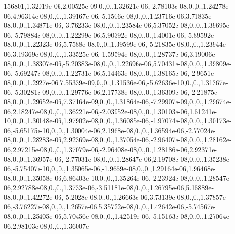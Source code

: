 {156801,1.\-32019e-\/06,2.\-00525e-\/09,0.,0.,1.\-32621e-\/06,-\/2.\-78103e-\/08,0.,0.,1.\-24278e-\/06,4.\-96314e-\/08,0.,0.,1.\-39167e-\/06,-\/5.\-1506e-\/08,0.,0.,1.\-23716e-\/06,3.\-71835e-\/08,0.,0.,1.\-34871e-\/06,-\/3.\-76233e-\/08,0.,0.,1.\-23584e-\/06,5.\-37052e-\/08,0.,0.,1.\-39695e-\/06,-\/5.\-79884e-\/08,0.,0.,1.\-22299e-\/06,5.\-90392e-\/08,0.,0.,1.\-4001e-\/06,-\/5.\-89592e-\/08,0.,0.,1.\-22323e-\/06,5.\-7588e-\/08,0.,0.,1.\-39599e-\/06,-\/5.\-21835e-\/08,0.,0.,1.\-23944e-\/06,3.\-19369e-\/08,0.,0.,1.\-33525e-\/06,-\/1.\-59594e-\/08,0.,0.,1.\-28737e-\/06,3.\-19006e-\/08,0.,0.,1.\-38307e-\/06,-\/5.\-20383e-\/08,0.,0.,1.\-22696e-\/06,5.\-70431e-\/08,0.,0.,1.\-39809e-\/06,-\/5.\-69247e-\/08,0.,0.,1.\-22731e-\/06,5.\-14463e-\/08,0.,0.,1.\-38165e-\/06,-\/2.\-9651e-\/08,0.,0.,1.\-2927e-\/06,7.\-55339e-\/09,0.,0.,1.\-31536e-\/06,-\/5.\-62636e-\/10,0.,0.,1.\-31367e-\/06,-\/5.\-30281e-\/09,0.,0.,1.\-29776e-\/06,2.\-17738e-\/08,0.,0.,1.\-36309e-\/06,-\/2.\-21875e-\/08,0.,0.,1.\-29652e-\/06,7.\-37164e-\/09,0.,0.,1.\-31864e-\/06,-\/7.\-29907e-\/09,0.,0.,1.\-29674e-\/06,2.\-18247e-\/08,0.,0.,1.\-36221e-\/06,-\/2.\-03952e-\/08,0.,0.,1.\-30103e-\/06,1.\-51241e-\/10,0.,0.,1.\-30148e-\/06,1.\-97902e-\/08,0.,0.,1.\-36085e-\/06,-\/1.\-97074e-\/08,0.,0.,1.\-30173e-\/06,-\/5.\-65175e-\/10,0.,0.,1.\-30004e-\/06,2.\-1968e-\/08,0.,0.,1.\-36594e-\/06,-\/2.\-77024e-\/08,0.,0.,1.\-28283e-\/06,2.\-92369e-\/08,0.,0.,1.\-37054e-\/06,-\/2.\-96407e-\/08,0.,0.,1.\-28162e-\/06,2.\-97215e-\/08,0.,0.,1.\-37079e-\/06,-\/2.\-96408e-\/08,0.,0.,1.\-28186e-\/06,2.\-92371e-\/08,0.,0.,1.\-36957e-\/06,-\/2.\-77031e-\/08,0.,0.,1.\-28647e-\/06,2.\-19708e-\/08,0.,0.,1.\-35238e-\/06,-\/5.\-75407e-\/10,0.,0.,1.\-35065e-\/06,-\/1.\-9669e-\/08,0.,0.,1.\-29164e-\/06,1.\-96468e-\/08,0.,0.,1.\-35058e-\/06,6.\-86403e-\/10,0.,0.,1.\-35264e-\/06,-\/2.\-23924e-\/08,0.,0.,1.\-28547e-\/06,2.\-92788e-\/08,0.,0.,1.\-3733e-\/06,-\/3.\-51181e-\/08,0.,0.,1.\-26795e-\/06,5.\-15889e-\/08,0.,0.,1.\-42272e-\/06,-\/5.\-2028e-\/08,0.,0.,1.\-26663e-\/06,3.\-73139e-\/08,0.,0.,1.\-37857e-\/06,-\/3.\-76227e-\/08,0.,0.,1.\-2657e-\/06,5.\-35722e-\/08,0.,0.,1.\-42642e-\/06,-\/5.\-74567e-\/08,0.,0.,1.\-25405e-\/06,5.\-70456e-\/08,0.,0.,1.\-42519e-\/06,-\/5.\-15163e-\/08,0.,0.,1.\-27064e-\/06,2.\-98103e-\/08,0.,0.,1.\-36007e-}
